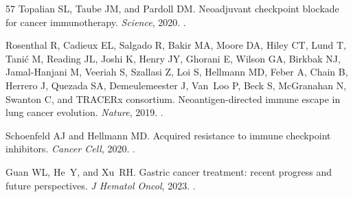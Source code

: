 \documentclass[11pt]{article}
\begin{document}
\begin{thebibliography}{57}
Topalian SL, Taube JM, and Pardoll DM.
\newblock Neoadjuvant checkpoint blockade for cancer immunotherapy.
\newblock \emph{Science}, 2020.
\newblock {}.

Rosenthal R, Cadieux EL, Salgado R, Bakir MA, Moore DA, Hiley CT, Lund T,
  Tanić M, Reading JL, Joshi K, Henry JY, Ghorani E, Wilson GA, Birkbak NJ,
  Jamal-Hanjani M, Veeriah S, Szallasi Z, Loi S, Hellmann MD, Feber A, Chain B,
  Herrero J, Quezada SA, Demeulemeester J, Van~Loo P, Beck S, McGranahan N,
  Swanton C, and TRACERx consortium.
\newblock Neoantigen-directed immune escape in lung cancer evolution.
\newblock \emph{Nature}, 2019.
\newblock {}.

Schoenfeld AJ and Hellmann MD.
\newblock Acquired resistance to immune checkpoint inhibitors.
\newblock \emph{Cancer Cell}, 2020.
\newblock {}.

Guan WL, He~Y, and Xu~RH.
\newblock Gastric cancer treatment: recent progress and future perspectives.
\newblock \emph{J Hematol Oncol}, 2023.
\newblock {}.

\end{thebibliography}
\end{document}

